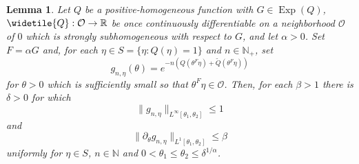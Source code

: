 \documentclass[11pt]{article}
\newtheorem{lemma}[theorem]{Lemma}
\newcommand\Exp{\operatorname{Exp}}
\begin{document}
\begin{lemma}\label{lem:AmplitudeSobolevEstimates}
Let $Q$ be a positive-homogeneous function with $G\in\Exp(Q)$, $\widetile{Q}:\mathcal{O}\to\mathbb{R}$ be once continuously differentiable on a neighborhood $\mathcal{O}$ of $0$ which is strongly subhomogeneous with respect to $G$, and let $\alpha>0$. Set $F=\alpha G$ and, for each $\eta\in S=\{\eta:Q(\eta)=1\}$ and $n\in\mathbb{N}_+$, set
\begin{equation*}
    g_{n,\eta}(\theta)=e^{-n(Q(\theta^F\eta)+\widetilde{Q}(\theta^F\eta))}
\end{equation*}
for $\theta>0$ which is sufficiently small so that $\theta^F\eta\in\mathcal{O}$. Then, for each $\beta>1$ there is $\delta>0$ for which 
\begin{equation*}
    \|g_{n,\eta}\|_{L^\infty[\theta_1,\theta_2]}\leq 1
\end{equation*}
and
\begin{equation*}
    \|\partial_\theta g_{n,\eta}\|_{L^1[\theta_1,\theta_2]}\leq \beta
\end{equation*}
uniformly for $\eta\in S$, $n\in\mathbb{N}$ and $0<\theta_1\leq\theta_2\leq \delta^{1/\alpha}$.
\end{lemma}
\end{document}
